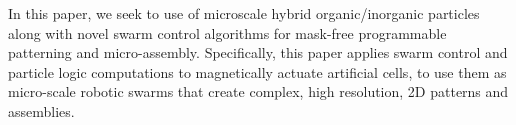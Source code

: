 In this paper, we seek to use of microscale hybrid organic/inorganic particles along with novel swarm control algorithms for mask-free programmable patterning and micro-assembly. 
Specifically, this paper applies swarm control and particle logic computations to magnetically actuate artificial cells, to use them as micro-scale robotic swarms that create complex, high resolution, 2D patterns and assemblies.












